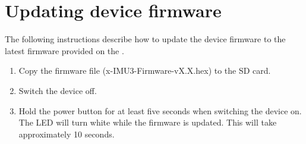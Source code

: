 \section{Updating device firmware}
\label{sec:updatingDeviceFirmware}

The following instructions describe how to update the device firmware to the latest firmware provided on the \productWebPage{}.

\begin{enumerate}
\item Copy the firmware file (x-IMU3-Firmware-vX.X.hex) to the \ac{SD} card.
\item Switch the device off.
\item Hold the power button for at least five seconds when switching the device on.  The \ac{LED} will turn white while the firmware is updated.  This will take approximately 10 seconds.
\end{enumerate}

